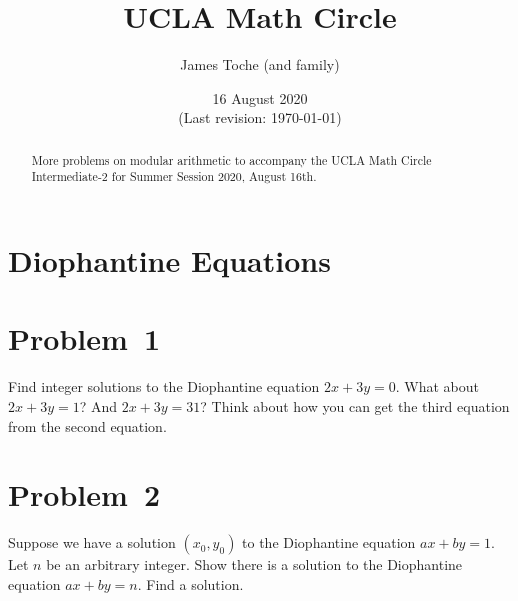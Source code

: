 \documentclass[12pt]{article}
\title{UCLA Math Circle}
\author{James Toche (and family)}
\date{16 August 2020 \\(Last revision: \today)}
\begin{document}
\begin{minipage}{\textwidth}
\maketitle
\begin{abstract}
More problems on modular arithmetic to accompany the UCLA Math Circle Intermediate-2 for Summer Session 2020, August 16th. 
\end{abstract}
\end{minipage}


\section*{Diophantine Equations}

\section*{Problem~1}
\begin{question}
Find integer solutions to the Diophantine equation $2x+3y = 0$. What about $2x+3y = 1$? And $2x+3y = 31$? Think about how you can get the third equation from the second equation.
\end{question}


\section*{Problem~2}
\begin{question}
Suppose we have a solution $(x_{0},y_{0})$ to the Diophantine equation $ax+by=1$. Let $n$ be an arbitrary integer. Show there is a solution to the Diophantine equation $ax+by=n$. Find a solution.
\end{question}
\end{document}

